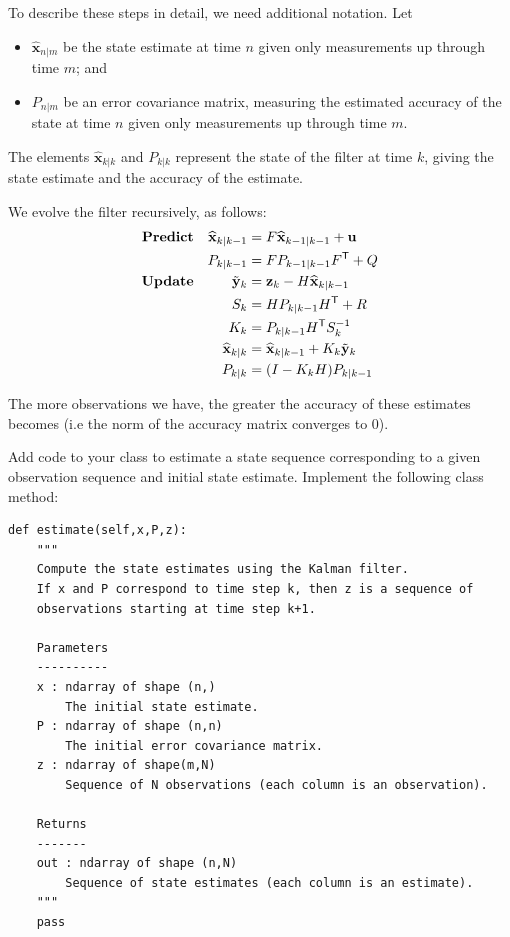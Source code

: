 To describe these steps in detail, we need additional notation. Let
\begin{itemize}
    \item $\widehat{\mathbf{x}}_{n|m}$ be the state estimate at time $n$ given only measurements up through time $m$; and
    \item $P_{n|m}$ be an error covariance matrix, measuring the estimated accuracy of the state at time $n$ given only measurements up through time $m$.
\end{itemize}

The elements $\widehat{\mathbf{x}}_{k|k}$ and $P_{k|k}$ represent the state of the filter at time $k$, giving the state estimate and the accuracy of the estimate.


We evolve the filter recursively, as follows:
\begin{align*}
\textbf{Predict} & & \widehat{\mathbf{x}}_{k|k-1} & = F\widehat{\mathbf{x}}_{k-1|k-1} + \mathbf{u} \\
 & & P_{k|k-1} & = FP_{k-1|k-1}F^{\mathsf T}  + Q \\
\textbf{Update} & & \tilde{\mathbf{y}}_{k} & = \mathbf{z}_{k} - H\widehat{\mathbf{x}}_{k|k-1} \\
 & & S_{k} & = HP_{k|k-1}H^{\mathsf T}  + R \\
 & & K_{k} & = P_{k|k-1}H^{\mathsf T} S_{k}^{-1} \\
 & & \widehat{\mathbf{x}}_{k|k} & = \widehat{\mathbf{x}}_{k|k-1} + K_{k}\tilde{\mathbf{y}}_{k} \\
 & & P_{k|k} & = (I - K_{k}H)P_{k|k-1}
\end{align*}

The more observations we have, the greater the accuracy of these estimates becomes (i.e the norm of the accuracy matrix converges to $0$).

\begin{problem}
Add code to your  class to estimate a state sequence corresponding to a given observation sequence and initial state estimate.
Implement the following class method:
\begin{lstlisting}
def estimate(self,x,P,z):
    """
    Compute the state estimates using the Kalman filter.
    If x and P correspond to time step k, then z is a sequence of
    observations starting at time step k+1.

    Parameters
    ----------
    x : ndarray of shape (n,)
        The initial state estimate.
    P : ndarray of shape (n,n)
        The initial error covariance matrix.
    z : ndarray of shape(m,N)
        Sequence of N observations (each column is an observation).

    Returns
    -------
    out : ndarray of shape (n,N)
        Sequence of state estimates (each column is an estimate).
    """
    pass
\end{lstlisting}
\end{problem}

